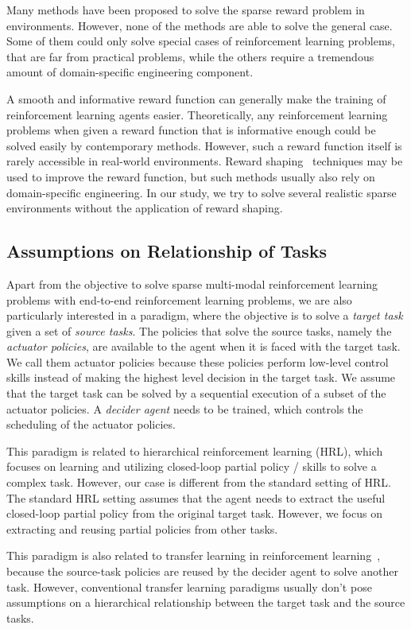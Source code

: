 Many methods have been proposed to solve the sparse reward problem in environments. However, none of the methods are able to solve the general case. Some of them could only solve special cases of reinforcement learning problems, that are far from practical problems, while the others require a tremendous amount of domain-specific engineering component.

A smooth and informative reward function can generally make the training of reinforcement learning agents easier. Theoretically, any reinforcement learning problems when given a reward function that is informative enough could be solved easily by contemporary methods. However, such a reward function itself is rarely accessible in real-world environments. Reward shaping~\cite{ng1999policy} techniques may be used to improve the reward function, but such methods usually also rely on domain-specific engineering. In our study, we try to solve several realistic sparse environments without the application of reward shaping.


\subsection{Assumptions on Relationship of Tasks}
Apart from the objective to solve sparse multi-modal reinforcement learning problems with end-to-end reinforcement learning problems, we are also particularly interested in a paradigm, where the objective is to solve a \textit{target task } given a set of \textit{source tasks}. The policies that solve the source tasks, namely the \textit{actuator policies}, are available to the agent when it is faced with the target task. We call them actuator policies because these policies perform low-level control skills instead of making the highest level decision in the target task. We assume that the target task can be solved by a sequential execution of a subset of the actuator policies. A \textit{decider agent} needs to be trained, which controls the scheduling of the actuator policies.

This paradigm is related to hierarchical reinforcement learning (HRL), which focuses on learning and utilizing closed-loop partial policy / skills to solve a complex task. However, our case is different from the standard setting of HRL. The standard HRL setting assumes that the agent needs to extract the useful closed-loop partial policy from the original target task. However, we focus on extracting and reusing partial policies from other tasks.

This paradigm is also related to transfer learning in reinforcement learning~\cite{taylor2009transfer}, because the source-task policies are reused by the decider agent to solve another task. However, conventional transfer learning paradigms usually don't pose assumptions on a hierarchical relationship between the target task and the source tasks.

